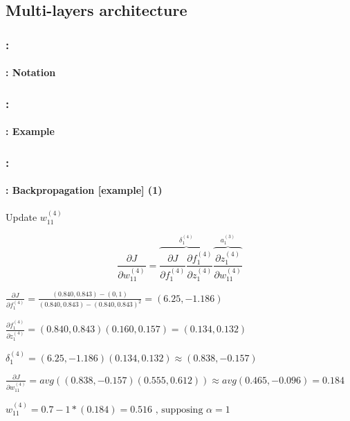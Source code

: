 \documentclass[xcolor=table]{beamer}
\begin{document}
\subsection{Multi-layers architecture}

\begin{frame}
	\frametitle{\insertshortsubtitle: \insertsection}
	\framesubtitle{\insertsubsection: Notation}

	\begin{center}
	\end{center}

\end{frame}

\begin{frame}
	\frametitle{\insertshortsubtitle: \insertsection}
	\framesubtitle{\insertsubsection: Example}


\end{frame}

\begin{frame}
	\frametitle{\insertshortsubtitle: \insertsection}
	\framesubtitle{\insertsubsection: Backpropagation [example] (1)}
	
	Update $w_{11}^{(4)}$
	
	\small
	
	\[
	\frac{\partial J}{\partial w_{11}^{(4)}} = \overbrace{\frac{\partial J}{\partial f_{1}^{(4)}} \frac{\partial f_{1}^{(4)}}{\partial z_{1}^{(4)}}}^{\delta_{1}^{(4)}} \overbrace{\frac{\partial z_{1}^{(4)}}{\partial w_{11}^{(4)}}}^{a_{1}^{(3)}}
	\]
	
	$ 
	\frac{\partial J}{\partial f_{1}^{(4)}} = \frac{(0.840, 0.843) - (0, 1)}{(0.840, 0.843) - (0.840, 0.843)^2} 
	= (6.25, -1.186)
	$
	
	$ 
	\frac{\partial f_{1}^{(4)}}{\partial z_{1}^{(4)}} = (0.840, 0.843) (0.160, 0.157) = (0.134, 0.132)
	$
	
	$
	\delta_{1}^{(4)} = (6.25, -1.186) (0.134, 0.132) \approx (0.838, -0.157)
	$
	
	$
	\frac{\partial J}{\partial w_{11}^{(4)}} = avg((0.838, -0.157) (0.555, 0.612)) 
	\approx avg(0.465, -0.096) = 0.184
	$
	
	$
	w_{11}^{(4)} = 0.7 - 1 * (0.184) = 0.516 \text{ , supposing } \alpha = 1
	$

\end{frame}
\end{document}
